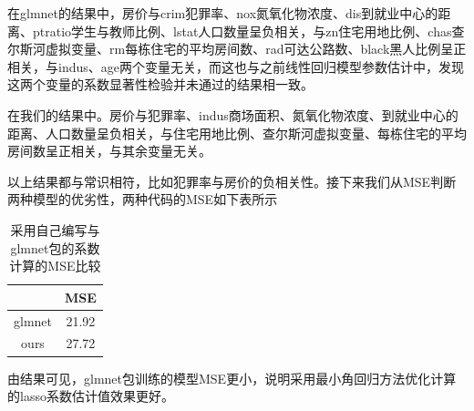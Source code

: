    在glmnet的结果中，房价与crim犯罪率、nox氮氧化物浓度、dis到就业中心的距离、ptratio学生与教师比例、lstat人口数量呈负相关，与zn住宅用地比例、chas查尔斯河虚拟变量、rm每栋住宅的平均房间数、rad可达公路数、black黑人比例呈正相关，与indus、age两个变量无关，而这也与之前线性回归模型参数估计中，发现这两个变量的系数显著性检验并未通过的结果相一致。

    在我们的结果中。房价与犯罪率、indus商场面积、氮氧化物浓度、到就业中心的距离、人口数量呈负相关，与住宅用地比例、查尔斯河虚拟变量、每栋住宅的平均房间数呈正相关，与其余变量无关。

    以上结果都与常识相符，比如犯罪率与房价的负相关性。接下来我们从MSE判断两种模型的优劣性，两种代码的MSE如下表所示
    \begin{table}[H]
        \centering
        \caption{采用自己编写与glmnet包的系数计算的MSE比较}
        \begin{tabular}{|c|c|}
        \hline
               & MSE   \\ \hline
        glmnet & 21.92 \\ \hline
        ours   & 27.72 \\ \hline
        \end{tabular}
    \end{table}
    由结果可见，glmnet包训练的模型MSE更小，说明采用最小角回归方法优化计算的lasso系数估计值效果更好。
